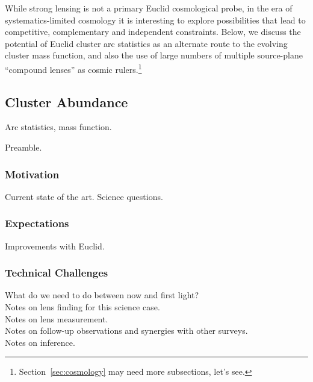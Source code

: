 \documentclass[twocolumn]{svjour3}
\begin{document}
While strong lensing is not a primary Euclid cosmological probe, in the
era of systematics-limited cosmology it is interesting to explore
possibilities that lead to competitive, complementary and independent
constraints. Below, we discuss the potential of Euclid cluster arc
statistics as an alternate route to the evolving cluster mass function,
and also the use of large numbers of multiple source-plane ``compound
lenses'' as cosmic rulers.\footnote{Section~\ref{sec:cosmology} may need
more subsections, let's see.}


\subsection{Cluster Abundance}



Arc statistics, mass function.

Preamble.

\subsubsection{Motivation}
Current state of the art. Science questions.\\

\subsubsection{Expectations}
Improvements with Euclid.\\

\subsubsection{Technical Challenges}

What do we need to do between now and first light?\\

Notes on lens finding for this science case.\\

Notes on lens measurement.\\

Notes on follow-up observations and synergies with other surveys.\\

Notes on inference.\\
\end{document}
